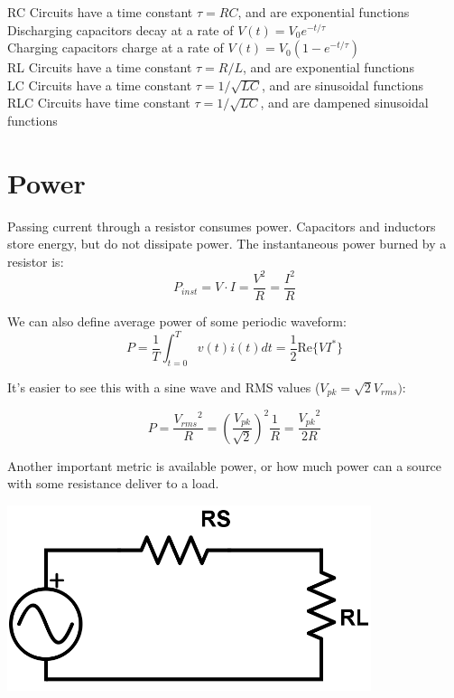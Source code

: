 \documentclass[12pt]{article}
\begin{document}
RC Circuits have a time constant $\tau = RC$, and are exponential functions\\
Discharging capacitors decay at a rate of $V(t) = V_0 e^{-t/\tau}$\\
Charging capacitors charge at a rate of $V(t) = V_0 (1 - e^{-t/\tau})$\\

RL Circuits have a time constant $\tau = R/L$, and are exponential functions\\

LC Circuits have a time constant $\tau = 1/\sqrt{LC}$, and are sinusoidal functions\\

RLC Circuits have time constant $\tau =  1/\sqrt{LC}$, and are dampened sinusoidal functions


\section*{Power}

Passing current through a resistor consumes power. Capacitors and inductors store energy, but do not dissipate power. The instantaneous power burned by a resistor is:
\[ P_{inst} = V\cdot I = \dfrac{V^2}{R} = \dfrac{I^2}{R} \]

We can also define average power of some periodic waveform: 
\[ P = \dfrac{1}{T} \int_{t=0}^T v(t)i(t)dt = \dfrac{1}{2}\mathrm{Re}\{VI^*\} \]

It's easier to see this with a sine wave and RMS values ($V_{pk} = \sqrt{2}V_{rms})$:

\[ P = \dfrac{{V_{rms}}^2}{R} = \left(\dfrac{V_{pk}}{\sqrt{2}}\right)^2\dfrac{1}{R} = \dfrac{{V_{pk}}^2}{2R} \]

Another important metric is available power, or how much power can a source with some resistance deliver to a load.

\begin{center}
	\includegraphics[width=0.8\textwidth]{assets/ece210-power-available.png}
\end{center}
\end{document}
